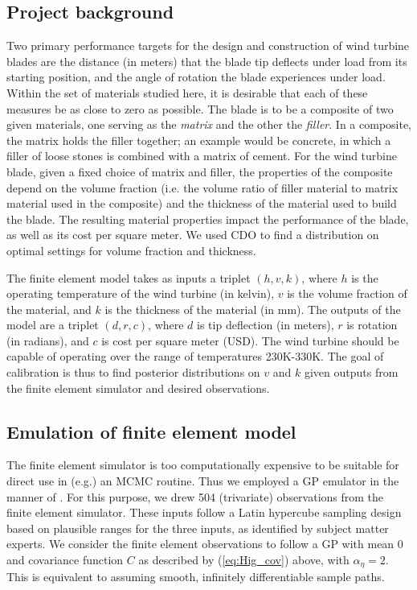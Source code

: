 \documentclass{article}
\begin{document}
\subsection{Project background}

Two primary performance targets for the design and construction of wind turbine blades are the distance (in meters) that the blade tip deflects under load from its starting position, and the angle of rotation the blade experiences under load.
%
Within the set of materials studied here, it is desirable that each of these measures be as close to zero as possible.
%
The blade is to be a composite of two given materials, one serving as the \textit{matrix} and the other the \textit{filler}. 
%
In a composite, the matrix holds the filler together; an example would be concrete, in which a filler of loose stones is combined with a matrix of cement.
%
For the wind turbine blade, given a fixed choice of matrix and filler, the properties of the composite depend on the volume fraction (i.e. the volume ratio of filler material to matrix material used in the composite) and the thickness of the material used to build the blade. 
%
The resulting material properties impact the performance of the blade, as well as its cost per square meter. 
%
We used CDO to find a distribution on optimal settings for volume fraction and thickness.

The finite element model takes as inputs a triplet $(h,v,k)$, where $h$ is the operating temperature of the wind turbine (in kelvin), $v$ is the volume fraction of the material, and $k$ is the thickness of the material (in mm). 
%
The outputs of the model are a triplet $(d,r,c)$, where $d$ is tip deflection (in meters), $r$ is rotation (in radians), and $c$ is cost per square meter (USD). 
The wind turbine should be capable of operating over the range of temperatures 230K-330K. 
%
The goal of calibration is thus to find posterior distributions on $v$ and $k$ given outputs from the finite element simulator and desired observations.

\subsection{Emulation of finite element model}\label{emulator}
The finite element simulator is too computationally expensive to be suitable for direct use in (e.g.) an MCMC routine. 
%
Thus we employed a GP emulator in the manner of \cite{Williams2006}. 
%
For this purpose, we drew 504 (trivariate) observations from the finite element simulator. 
%
These inputs follow a Latin hypercube sampling design \citep{McKay1979} based on plausible ranges for the three inputs, as identified by subject matter experts.
%
We consider the finite element observations to follow a GP with mean 0 and covariance function $C$ as described by (\ref{eq:Hig_cov}) above, with $\alpha_\eta=2$. 
%
This is equivalent to assuming smooth, infinitely differentiable sample paths. 
%
\end{document}
